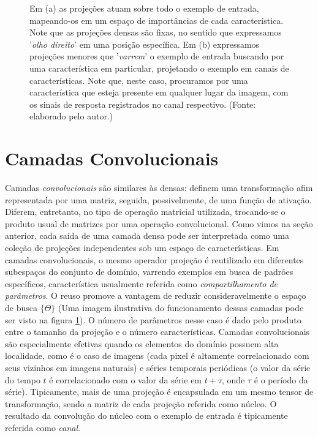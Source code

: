 \begin{figure}[ht!]
\begin{center}
\begin{subfigure}{0.6\textwidth}
		\caption{}
	\end{subfigure}
	\end{center}
	\small Em (a) as projeções atuam sobre todo o exemplo de entrada, mapeando-os em um espaço de importâncias de cada característica. Note que as projeções densas são fixas, no sentido que expressamos '\textit{olho direito}' em uma posição específica. Em (b) expressamos projeções menores que '\textit{varrem}' o exemplo de entrada buscando por uma característica em particular, projetando o exemplo em canais de características. Note que, neste caso, procuramos por uma característica que esteja presente em qualquer lugar da imagem, com os sinais de resposta registrados no canal respectivo. (Fonte: elaborado pelo autor.)
	\label{conv_lin}
\end{figure}


\section{Camadas Convolucionais}

Camadas \textit{convolucionais} \cite{LeCun1989, LeCun98} são similares às densas: definem uma transformação afim representada por uma matriz, seguida, possivelmente, de uma função de ativação. Diferem, entretanto, no tipo de operação matricial utilizada, trocando-se o produto usual de matrizes por uma operação convolucional. Como vimos na seção anterior, cada saída de uma camada densa pode ser interpretada como uma coleção de projeções independentes sob um espaço de características. Em camadas convolucionais, o mesmo operador projeção é reutilizado em diferentes subespaços do conjunto de domínio, varrendo exemplos em busca de padrões específicos, característica usualmente referida como \textit{compartilhamento de parâmetros}. O reuso promove a vantagem de reduzir consideravelmente o espaço de busca $\{\Theta\}$ (Uma imagem ilustrativa do funcionamento dessas camadas pode ser visto na figura \ref{conv_lin}). O número de parâmetros nesse caso é dado pelo produto entre o tamanho da projeção e o número características. Camadas convolucionais são especialmente efetivas quando os elementos do domínio possuem alta localidade, como é o caso de imagens (cada pixel é altamente correlacionado com seus vizinhos em imagens naturais) e séries temporais periódicas (o valor da série do tempo $t$ é correlacionado com o valor da série em $t + \tau$, onde $\tau$ é o período da série). Tipicamente, mais de uma projeção é encapsulada em um mesmo tensor de transformação, sendo a matriz de cada projeção referida como núcleo. O resultado da convolução do núcleo com o exemplo de entrada é tipicamente referida como \textit{canal}.

